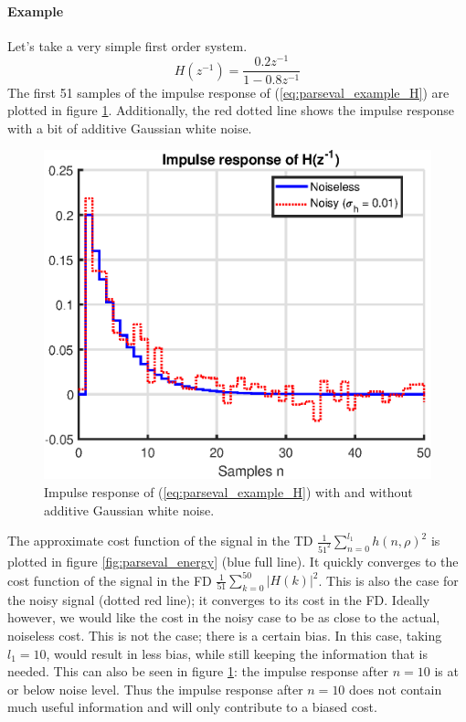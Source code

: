 \paragraph{Example}
Let's take a very simple first order system.
\begin{equation}
    H(z^{-1}) = \frac{0.2 z^{-1}}{1 - 0.8 z^{-1}}
    \label{eq:parseval_example_H}
\end{equation}
The first 51 samples of the impulse response of (\ref{eq:parseval_example_H}) are plotted in figure \ref{fig:parseval_signal}. Additionally, the red dotted line shows the impulse response with a bit of additive Gaussian white noise.

\begin{figure}[H]
    \centering
    \includegraphics[width = 0.65 \textwidth]{figures/parseval_signal.eps}
    \caption{Impulse response of (\ref{eq:parseval_example_H}) with and without additive Gaussian white noise.}
    \label{fig:parseval_signal}
\end{figure}

The approximate cost function of the signal in the TD $\frac{1}{51^2}\sum_{n=0}^{l_1} h(n,\rho)^2$ is plotted in figure \ref{fig:parseval_energy} (blue full line). It quickly converges to the cost function of the signal in the FD $\frac{1}{51} \sum_{k=0}^{50} |H(k)|^2$. This is also the case for the noisy signal (dotted red line); it converges to its cost in the FD. Ideally however, we would like the cost in the noisy case to be as close to the actual, noiseless cost. This is not the case; there is a certain bias. In this case, taking $l_1 = 10$, would result in less bias, while still keeping the information that is needed. This can also be seen in figure \ref{fig:parseval_signal}: the impulse response after $n = 10$ is at or below noise level. Thus the impulse response after $n = 10$ does not contain much useful information and will only contribute to a biased cost.

